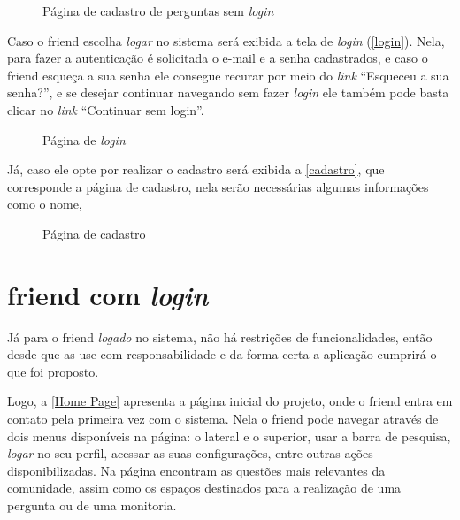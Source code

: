 \begin{figure}[htb]
\centering
\caption{\label{cadastro perguntas s/ login} Página de cadastro de perguntas sem \textit{login}}

\end{figure}
\FloatBarrier

Caso o \gls{friend} escolha \textit{logar} no sistema será exibida a tela de \textit{login} (\autoref{login}). Nela, para fazer a autenticação é solicitada o e-mail e a senha cadastrados, e caso o \gls{friend} esqueça a sua senha ele consegue recurar por meio do \textit{link} ``Esqueceu a sua senha?'', e se desejar continuar navegando sem fazer \textit{login} ele também pode basta clicar no \textit{link} ``Continuar sem login''.

\begin{figure}[htb]
\centering
\caption{\label{login} Página de \textit{login}}

\end{figure}
\FloatBarrier

Já, caso ele opte por realizar o cadastro será exibida a \autoref{cadastro}, que corresponde a página de cadastro, nela serão necessárias algumas informações como o nome, 

\begin{figure}[htb]
\centering
\caption{\label{cadastro} Página de cadastro}

\end{figure}
\FloatBarrier

\section{\gls{friend} com \textit{login}}
Já para o \gls{friend} \textit{logado} no sistema, não há restrições de funcionalidades, então desde que as use com responsabilidade e da forma certa a aplicação cumprirá o que foi proposto.

Logo, a \autoref{Home Page} apresenta a página inicial do projeto, onde o \gls{friend} entra em contato pela primeira vez com o sistema. Nela o \gls{friend} pode navegar através de dois menus disponíveis na página: o lateral e o superior, usar a barra de pesquisa, \textit{logar} no seu perfil, acessar as suas configurações, entre outras ações disponibilizadas. Na página encontram as questões mais relevantes da comunidade, assim como os espaços destinados para a realização de uma pergunta ou de uma monitoria.

